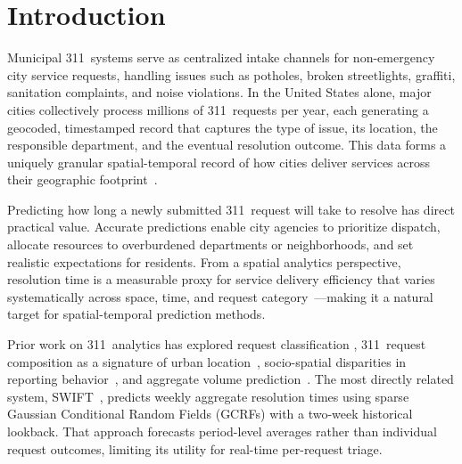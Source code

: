 \documentclass[sigconf,nonacm]{acmart}
\begin{document}

\maketitle

\section{Introduction}
\label{sec:intro}

Municipal 311~systems serve as centralized intake channels for
non-emergency city service requests, handling issues such as
potholes, broken streetlights, graffiti, sanitation complaints,
and noise violations. In the United States alone, major cities
collectively process millions of 311~requests per year, each
generating a geocoded, timestamped record that captures the type
of issue, its location, the responsible department, and the
eventual resolution outcome. This data forms a uniquely granular
spatial-temporal record of how cities deliver services across
their geographic footprint~\cite{zheng2014urban,
wang2017structure311}.

Predicting how long a newly submitted 311~request will take to
resolve has direct practical value. Accurate predictions enable
city agencies to prioritize dispatch, allocate resources to
overburdened departments or neighborhoods, and set realistic
expectations for residents. From a spatial analytics perspective,
resolution time is a measurable proxy for service delivery
efficiency that varies systematically across space, time, and
request category~\cite{wang2017structure311}---making it a natural
target for spatial-temporal prediction methods.

Prior work on 311~analytics has explored request classification
\cite{kim2021classification311}, 311~request composition as a
signature of urban location~\cite{wang2017structure311},
socio-spatial disparities in reporting
behavior~\cite{kontokosta2021bias}, and aggregate volume
prediction~\cite{cheng2022311ml}. The most directly related
system, SWIFT~\cite{raj2021swift}, predicts weekly aggregate
resolution times using sparse Gaussian Conditional Random Fields
(GCRFs) with a two-week historical lookback. That approach
forecasts period-level averages rather than individual request
outcomes, limiting its utility for real-time per-request triage.
\end{document}
